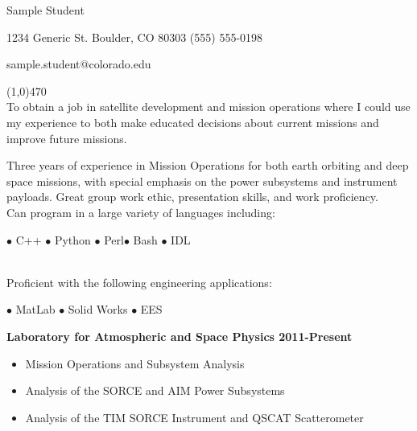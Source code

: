 \documentclass[11pt]{article} %
\begin{document}


\centerline{{\Huge \sc Sample Student}}  %
\centerline{1234 Generic St. \textbullet \hspace{5pt}Boulder, CO 80303 \textbullet \hspace{5pt} (555) 555-0198}
\centerline{sample.student@colorado.edu}
\noindent
\line(1,0){470}\\




\smallskip %
\noindent
To obtain a job in satellite development and mission operations where I could use my experience to both make educated decisions about current missions and improve future missions.\medskip


\bigskip %
\smallskip
\noindent
Three years of experience in Mission Operations for both earth orbiting and deep space missions, with special emphasis on the power subsystems and instrument payloads. Great group work ethic, presentation skills, and work proficiency.\\


\noindent %
Can program in a large variety of languages including: \\ 
\centerline{\hfill $\bullet$ C++ \hfill $\bullet$ Python \hfill $\bullet$ Perl\hfill $\bullet$ Bash \hfill $\bullet$ IDL \hfill}\\
\smallskip
Proficient with the following engineering applications: \\
\centerline{\hfill $\bullet$ MatLab \hfill $\bullet$ Solid Works \hfill $\bullet$ EES \hfill}
\smallskip


 \medskip


\noindent \centerline{\large \bf Laboratory for Atmospheric and Space Physics \hfill 2011-Present}
\begin{itemize}
  \item Mission Operations and Subsystem Analysis
  \item Analysis of the SORCE and AIM Power Subsystems
  \item Analysis of the TIM SORCE Instrument and QSCAT Scatterometer
\end{itemize}
\end{document}
